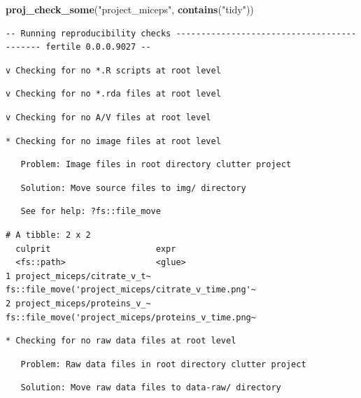 \documentclass[12pt,twoside]{reedthesis}
\newenvironment{Shaded}{\begin{snugshade}}{\end{snugshade}}
\newcommand{\KeywordTok}[1]{\textcolor[rgb]{0.13,0.29,0.53}{\textbf{#1}}}
\newcommand{\StringTok}[1]{\textcolor[rgb]{0.31,0.60,0.02}{#1}}
\newcommand{\NormalTok}[1]{#1}
\begin{document}
\footnotesize
\begin{Shaded}
\begin{Highlighting}[]
\KeywordTok{proj_check_some}\NormalTok{(}\StringTok{"project_miceps"}\NormalTok{, }\KeywordTok{contains}\NormalTok{(}\StringTok{"tidy"}\NormalTok{))}
\end{Highlighting}
\end{Shaded}
\begin{verbatim}
-- Running reproducibility checks ------------------------------------------- fertile 0.0.0.9027 --
\end{verbatim}
\begin{verbatim}
v Checking for no *.R scripts at root level
\end{verbatim}
\begin{verbatim}
v Checking for no *.rda files at root level
\end{verbatim}
\begin{verbatim}
v Checking for no A/V files at root level
\end{verbatim}
\begin{verbatim}
* Checking for no image files at root level
\end{verbatim}
\begin{verbatim}
   Problem: Image files in root directory clutter project
\end{verbatim}
\begin{verbatim}
   Solution: Move source files to img/ directory
\end{verbatim}
\begin{verbatim}
   See for help: ?fs::file_move
\end{verbatim}
\begin{verbatim}
# A tibble: 2 x 2
  culprit                     expr                                              
  <fs::path>                  <glue>                                            
1 project_miceps/citrate_v_t~ fs::file_move('project_miceps/citrate_v_time.png'~
2 project_miceps/proteins_v_~ fs::file_move('project_miceps/proteins_v_time.png~
\end{verbatim}
\begin{verbatim}
* Checking for no raw data files at root level
\end{verbatim}
\begin{verbatim}
   Problem: Raw data files in root directory clutter project
\end{verbatim}
\begin{verbatim}
   Solution: Move raw data files to data-raw/ directory
\end{verbatim}
\end{document}
